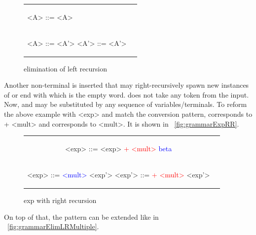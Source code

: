 \begin{figure}
	\label{ambGrammarPrecFixedTree}
	\caption{elimination of left recursion}

	\begin{center}
		\begin{tabular}{p{5cm} p{5cm}}
			\begin{grammar}
				<A> ::= <A> \textcolor{red}{\alpha}
				\alt \textcolor{blue}{\beta}
			\end{grammar}
			\\
			\begin{grammar}
				<A> ::= \textcolor{blue}{\beta} <A'>
				<A'> ::= \textcolor{red}{\alpha} <A'>
				\alt \epsilon
			\end{grammar}
		\end{tabular}
	\end{center}
\end{figure}

Another non-terminal is inserted that may right-recursively spawn new instances of \alpha or end with \epsilon which is the empty word. \epsilon does not take any token from the input. Now, \alpha and \beta may be substituted by any sequence of variables/terminals. To reform the above example with <exp> and match the conversion pattern, \alpha corresponds to + <mult> and \beta corresponds to <mult>. It is shown in ~\ref{fig:grammarExpRR}.

\begin{figure}
	\label{grammarExpRR}
	\caption{exp with right recursion}

	\begin{center}
		\begin{tabular}{c c}
			\begin{grammar}
				<exp> ::= <exp> \textcolor{red}{+ <mult>}
				\alt \textcolor{blue}{beta}
			\end{grammar}
			\\
			\begin{grammar}
				<exp> ::= \textcolor{blue}{<mult>} <exp'>
				<exp'> ::= \textcolor{red}{+ <mult>} <exp'>
				\alt \epsilon
			\end{grammar}
		\end{tabular}
	\end{center}
\end{figure}

On top of that, the pattern can be extended like in ~\ref{fig:grammarElimLRMultiple}.

